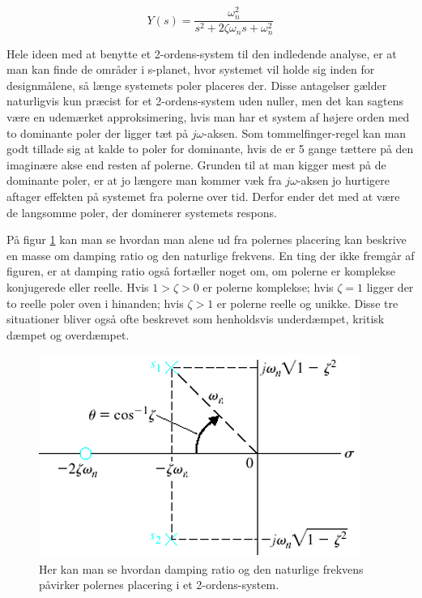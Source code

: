 \begin{equation}\label{eq:SO_system}
Y(s)=\frac{\omega_{n}^2}{s^2+2\zeta\omega_{n}s+\omega_{n}^2}
\end{equation}

Hele ideen med at benytte et 2-ordens-system til den indledende analyse, er at man kan finde de områder i s-planet, hvor systemet vil holde sig inden for designmålene, så længe systemets poler placeres der. Disse antagelser gælder naturligvis kun præcist for et 2-ordens-system uden nuller, men det kan sagtens være en udemærket approksimering, hvis man har et system af højere orden med to dominante poler der ligger tæt på $j\omega$-aksen. Som tommelfinger-regel kan man godt tillade sig at kalde to poler for dominante, hvis de er 5 gange tættere på den imaginære akse end resten af polerne. Grunden til at man kigger mest på de dominante poler, er at jo længere man kommer væk fra $j\omega$-aksen jo hurtigere aftager effekten på systemet fra polerne over tid. Derfor ender det med at være de langsomme poler, der dominerer systemets respons.



På figur \ref{fig:SO_system} kan man se hvordan man alene ud fra polernes placering kan beskrive en masse om damping ratio og den naturlige frekvens. En ting der ikke fremgår af figuren, er at damping ratio også fortæller noget om, om polerne er komplekse konjugerede eller reelle. Hvis $1>\zeta>0$ er polerne komplekse; hvis $\zeta=1$ ligger der to reelle poler oven i hinanden; hvis $\zeta>1$ er polerne reelle og unikke. Disse tre situationer bliver også ofte beskrevet som henholdsvis underdæmpet, kritisk dæmpet og overdæmpet.

\begin{figure}
\vspace{-20pt}	
	\includegraphics[scale=0.5]{Billeder/Damping_Ratio.PNG}
	\centering
	\vspace{-10pt}
	\caption{Her kan man se hvordan damping ratio og den naturlige frekvens påvirker polernes placering i et 2-ordens-system.}
	\label{fig:SO_system}
\vspace{-20pt}
\end{figure}


